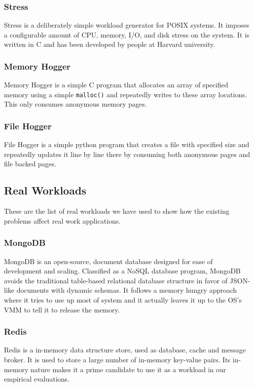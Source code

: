       \subsubsection{Stress}
	Stress \cite{stress} is a deliberately simple workload generator for POSIX systems. It imposes a configurable amount of CPU, 
memory, I/O, and disk stress on the system. It is written in C and has been developed by people at Harvard university. 
      
      \subsubsection{Memory Hogger}
	Memory Hogger is a simple C program that allocates an array of specified memory using a simple \texttt{malloc()} and repeatedly 
writes to these array locations. This only consumes anonymous memory pages.
      
      \subsubsection{File Hogger}
	File Hogger is a simple python program that creates a file with specified size and repeatedly updates it line by line there by 
consuming both anonymous pages and file backed pages.

    \subsection{Real Workloads}
    
      These are the list of real workloads we have used to show how the existing problems affect real work applications.
      
      \subsubsection{MongoDB}
	MongoDB \cite{mongodb} is an open-source, document database designed for ease of development and scaling. Classified as a NoSQL 
database program, MongoDB avoids the traditional table-based relational database structure in favor of JSON-like documents with dynamic 
schemas. It follows a memory hungry approach where it tries to use up most of system and it actually leaves it up to the OS's 
VMM to tell it to release the memory.

      \subsubsection{Redis}
	Redis \cite{redis} is a in-memory data structure store, used as database, cache and message broker. It is used to store a large 
number of in-memory key-value pairs. Its in-memory nature makes it a prime candidate to use it as a workload in our empirical evaluations.
   
